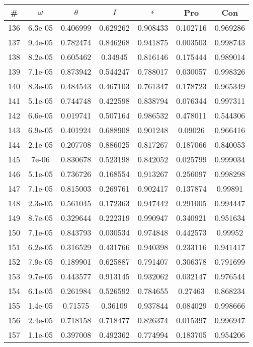 \newpage
\begin{table}
\begin{tabular}{c|c|c|c|c|c|c}
\# & $\omega$ & $\theta$ & $I$ & $\epsilon$ & Pro & Con\\
\hline
136 & 6.3e-05 & 0.406999 & 0.629262 & 0.908433 & 0.102716 & 0.969286\\
137 & 9.4e-05 & 0.782474 & 0.846268 & 0.941875 & 0.003503 & 0.998743\\
138 & 8.2e-05 & 0.605462 & 0.34945 & 0.816146 & 0.175444 & 0.989014\\
139 & 7.1e-05 & 0.873942 & 0.544247 & 0.788017 & 0.030057 & 0.998326\\
140 & 8.3e-05 & 0.484543 & 0.467103 & 0.761347 & 0.178723 & 0.965349\\
141 & 5.1e-05 & 0.744748 & 0.422598 & 0.838794 & 0.076344 & 0.997311\\
142 & 6.6e-05 & 0.019741 & 0.507164 & 0.986532 & 0.478011 & 0.544306\\
143 & 6.9e-05 & 0.401924 & 0.688908 & 0.901248 & 0.09026 & 0.966416\\
144 & 2.1e-05 & 0.207708 & 0.886025 & 0.817267 & 0.187066 & 0.840053\\
145 & 7e-06 & 0.830678 & 0.523198 & 0.842052 & 0.025799 & 0.999034\\
146 & 5.1e-05 & 0.736726 & 0.168554 & 0.913267 & 0.256097 & 0.998298\\
147 & 7.1e-05 & 0.815003 & 0.269761 & 0.902417 & 0.137874 & 0.99891\\
148 & 2.3e-05 & 0.561045 & 0.172363 & 0.947442 & 0.291005 & 0.994447\\
149 & 8.7e-05 & 0.329644 & 0.222319 & 0.990947 & 0.340921 & 0.951634\\
150 & 7.1e-05 & 0.843793 & 0.030534 & 0.974848 & 0.442573 & 0.99952\\
151 & 6.2e-05 & 0.316529 & 0.431766 & 0.940398 & 0.233116 & 0.941417\\
152 & 7.9e-05 & 0.189901 & 0.625887 & 0.791407 & 0.306378 & 0.791699\\
153 & 9.7e-05 & 0.443577 & 0.913145 & 0.932062 & 0.032147 & 0.976544\\
154 & 6.1e-05 & 0.261984 & 0.526592 & 0.784655 & 0.27463 & 0.868234\\
155 & 1.4e-05 & 0.71575 & 0.36109 & 0.937844 & 0.084029 & 0.998666\\
156 & 2.4e-05 & 0.718158 & 0.718477 & 0.826374 & 0.015397 & 0.996947\\
157 & 1.1e-05 & 0.397008 & 0.492362 & 0.774994 & 0.183705 & 0.954206\\

\end{tabular}
\end{table}
